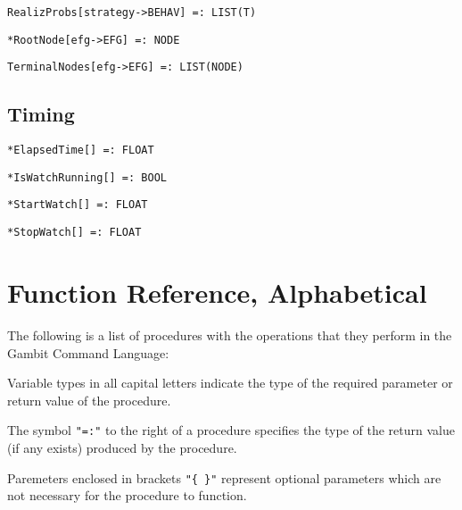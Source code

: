\protect \large \begin{verbatim}
RealizProbs[strategy->BEHAV] =: LIST(T)
\end{verbatim}\normalsize

\protect \large \begin{verbatim}
*RootNode[efg->EFG] =: NODE
\end{verbatim}\normalsize

\protect \large \begin{verbatim} 
TerminalNodes[efg->EFG] =: LIST(NODE)
\end{verbatim}\normalsize


\medskip
\subsection{Timing}


\protect \large \begin{verbatim}
*ElapsedTime[] =: FLOAT
\end{verbatim}\normalsize


\protect \large \begin{verbatim}
*IsWatchRunning[] =: BOOL
\end{verbatim}\normalsize


\protect \large \begin{verbatim}
*StartWatch[] =: FLOAT
\end{verbatim}\normalsize


\protect \large \begin{verbatim}
*StopWatch[] =: FLOAT
\end{verbatim}\normalsize


\section{Function Reference, Alphabetical}

The following is a list of procedures with the operations that they
perform in the Gambit Command Language:

Variable types in all capital letters indicate the type of the
required parameter or return value of the procedure.

The symbol {\tt "=:"} to the right of a procedure specifies the type
of the return value (if any exists) produced by the procedure.

Paremeters enclosed in brackets {\tt "\{ \}"} represent optional
parameters which are not necessary for the procedure to function.

